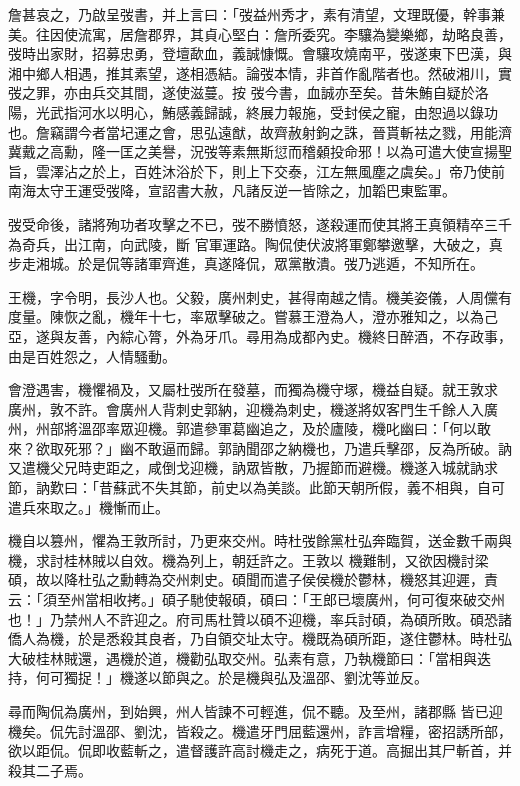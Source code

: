 \begin{pinyinscope}
 詹甚哀之，乃啟呈弢書，并上言曰：「弢益州秀才，素有清望，文理既優，幹事兼美。往因使流寓，居詹郡界，其貞心堅白：詹所委究。李驤為變樂鄉，劫略良善，弢時出家財，招募忠勇，登壇歃血，義誠慷慨。會驤攻燒南平，弢遂東下巴漢，與湘中鄉人相遇，推其素望，遂相憑結。論弢本情，非首作亂階者也。然破湘川，實弢之罪，亦由兵交其間，遂使滋蔓。按
 弢今書，血誠亦至矣。昔朱鮪自疑於洛陽，光武指河水以明心，鮪感義歸誠，終展力報施，受封侯之寵，由恕過以錄功也。詹竊謂今者當圮運之會，思弘遠猷，故齊赦射鉤之誅，晉貰斬袪之戮，用能濟冀戴之高勳，隆一匡之美譽，況弢等素無斯愆而稽顙投命邪！以為可遣大使宣揚聖旨，雲澤沾之於上，百姓沐浴於下，則上下交泰，江左無風塵之虞矣。」帝乃使前南海太守王運受弢降，宣詔書大赦，凡諸反逆一皆除之，加韜巴東監軍。



 弢受命後，諸將殉功者攻擊之不已，弢不勝憤怒，遂殺運而使其將王真領精卒三千為奇兵，出江南，向武陵，斷
 官軍運路。陶侃使伏波將軍鄭攀邀擊，大破之，真步走湘城。於是侃等諸軍齊進，真遂降侃，眾黨散潰。弢乃逃遁，不知所在。



 王機，字令明，長沙人也。父毅，廣州刺史，甚得南越之情。機美姿儀，人周儻有度量。陳恢之亂，機年十七，率眾擊破之。嘗慕王澄為人，澄亦雅知之，以為己亞，遂與友善，內綜心膂，外為牙爪。尋用為成都內史。機終日醉酒，不存政事，由是百姓怨之，人情騷動。



 會澄遇害，機懼禍及，又屬杜弢所在發墓，而獨為機守塚，機益自疑。就王敦求
 廣州，敦不許。會廣州人背刺史郭納，迎機為刺史，機遂將奴客門生千餘人入廣州，州部將溫邵率眾迎機。郭遣參軍葛幽追之，及於廬陵，機叱幽曰：「何以敢來？欲取死邪？」幽不敢逼而歸。郭訥聞邵之納機也，乃遣兵擊邵，反為所破。訥又遣機父兄時吏距之，咸倒戈迎機，訥眾皆散，乃握節而避機。機遂入城就訥求節，訥歎曰：「昔蘇武不失其節，前史以為美談。此節天朝所假，義不相與，自可遣兵來取之。」機慚而止。



 機自以篡州，懼為王敦所討，乃更來交州。時杜弢餘黨杜弘奔臨賀，送金數千兩與機，求討桂林賊以自效。機為列上，朝廷許之。王敦以
 機難制，又欲因機討梁碩，故以降杜弘之勳轉為交州刺史。碩聞而遣子侯侯機於鬱林，機怒其迎遲，責云：「須至州當相收拷。」碩子馳使報碩，碩曰：「王郎已壞廣州，何可復來破交州也！」乃禁州人不許迎之。府司馬杜贊以碩不迎機，率兵討碩，為碩所敗。碩恐諸僑人為機，於是悉殺其良者，乃自領交址太守。機既為碩所距，遂住鬱林。時杜弘大破桂林賊還，遇機於道，機勸弘取交州。弘素有意，乃執機節曰：「當相與迭持，何可獨捉！」機遂以節與之。於是機與弘及溫邵、劉沈等並反。



 尋而陶侃為廣州，到始興，州人皆諫不可輕進，侃不聽。及至州，諸郡縣
 皆已迎機矣。侃先討溫邵、劉沈，皆殺之。機遣牙門屈藍還州，詐言增糧，密招誘所部，欲以距侃。侃即收藍斬之，遣督護許高討機走之，病死于道。高掘出其尸斬首，并殺其二子焉。




\end{pinyinscope}

